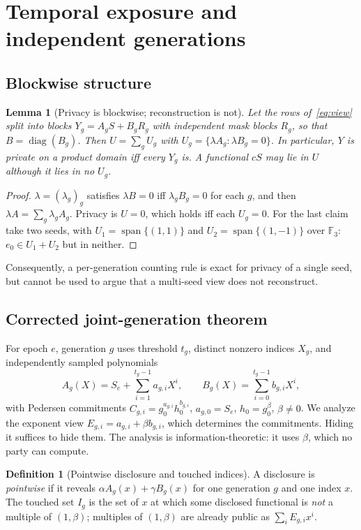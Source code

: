 \documentclass[pdflatex,sn-mathphys-num]{sn-jnl}
\theoremstyle{plain}
\newtheorem{lemma}[theorem]{Lemma}
\theoremstyle{definition}
\newtheorem{definition}[theorem]{Definition}
\newcommand{\F}{\mathbb{F}}
\begin{document}
\section{Temporal exposure and independent generations}\label{sec:temporal}

\subsection{Blockwise structure}
\begin{lemma}[Privacy is blockwise; reconstruction is not]\label{lem:block}
Let the rows of~\eqref{eq:view} split into blocks $Y_g=A_gS+B_gR_g$ with independent mask blocks $R_g$, so that $B=\operatorname{diag}(B_g)$. Then $U=\sum_gU_g$ with $U_g=\{\lambda A_g:\lambda B_g=0\}$. In particular, $Y$ is private on a product domain iff every $Y_g$ is. A functional $cS$ may lie in $U$ although it lies in no $U_g$.
\end{lemma}
\begin{proof}
$\lambda=(\lambda_g)_g$ satisfies $\lambda B=0$ iff $\lambda_gB_g=0$ for each $g$, and then $\lambda A=\sum_g\lambda_gA_g$. Privacy is $U=0$, which holds iff each $U_g=0$. For the last claim take two seeds, with $U_1=\operatorname{span}\{(1,1)\}$ and $U_2=\operatorname{span}\{(1,-1)\}$ over $\F_3$: $e_0\in U_1+U_2$ but in neither.
\end{proof}

Consequently, a per-generation counting rule is exact for privacy of a single seed, but cannot be used to argue that a multi-seed view does not reconstruct.

\subsection{Corrected joint-generation theorem}
For epoch $e$, generation $g$ uses threshold $t_g$, distinct nonzero indices $X_g$, and independently sampled polynomials
\begin{equation}\label{eq:sharing}
 A_g(X)=S_e+\sum_{i=1}^{t_g-1}a_{g,i}X^i,
 \qquad B_g(X)=\sum_{i=0}^{t_g-1}b_{g,i}X^i,
\end{equation}
with Pedersen commitments $C_{g,i}=g_0^{a_{g,i}}h_0^{b_{g,i}}$, $a_{g,0}=S_e$, $h_0=g_0^\beta$, $\beta\ne0$. We analyze the exponent view $E_{g,i}=a_{g,i}+\beta b_{g,i}$, which determines the commitments. Hiding it suffices to hide them. The analysis is information-theoretic: it uses $\beta$, which no party can compute.

\begin{definition}[Pointwise disclosure and touched indices]
A disclosure is \emph{pointwise} if it reveals $\alpha A_g(x)+\gamma B_g(x)$ for one generation $g$ and one index $x$. The touched set $I_g$ is the set of $x$ at which some disclosed functional is \emph{not} a multiple of $(1,\beta)$; multiples of $(1,\beta)$ are already public as $\sum_iE_{g,i}x^i$.
\end{definition}
\end{document}
